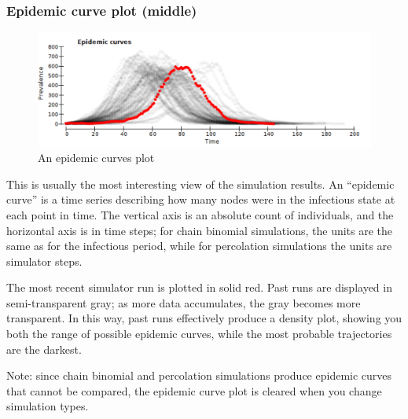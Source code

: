 \documentclass{article}
\begin{document}
\subsubsection{Epidemic curve plot (middle)}
\begin{figure}[h]
\begin{center}
\includegraphics[width = 6in]{curves_example.pdf}
\caption{An epidemic curves plot}
\end{center}
\end{figure}
This is usually the most interesting view of the simulation results.  An ``epidemic curve'' is a time series describing how many nodes were in the infectious state at each point in time.  The vertical axis is an absolute count of individuals, and the horizontal axis is in time steps; for chain binomial simulations, the units are the same as for the infectious period, while for percolation simulations the units are simulator steps.

The most recent simulator run is plotted in solid red.  Past runs are displayed in semi-transparent gray; as more data accumulates, the gray becomes more transparent.  In this way, past runs effectively produce a density plot, showing you both the range of possible epidemic curves, while the most probable trajectories are the darkest.

Note: since chain binomial and percolation simulations produce epidemic curves that cannot be compared, the epidemic curve plot is cleared when you change simulation types.
\end{document}
